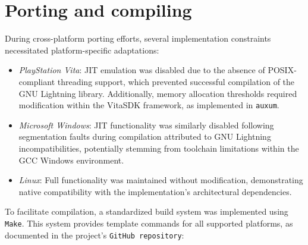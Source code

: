 \section{Porting and compiling}
\label{sec:ch4sec2}

\par During cross-platform porting efforts, several implementation constraints necessitated platform-specific adaptations:
\begin{itemize}
    \item \textit{PlayStation Vita}: JIT emulation was disabled due to the absence of POSIX-compliant threading support, which prevented successful compilation of the GNU Lightning library. Additionally, memory allocation thresholds required modification within the VitaSDK framework, as implemented in \texttt{auxum\cite{GithubAuxum}}.
    \item \textit{Microsoft Windows}: JIT functionality was similarly disabled following segmentation faults during compilation attributed to GNU Lightning incompatibilities, potentially stemming from toolchain limitations within the GCC Windows environment.
    \item \textit{Linux}: Full functionality was maintained without modification, demonstrating native compatibility with the implementation's architectural dependencies.
\end{itemize}

\par To facilitate compilation, a standardized build system was implemented using \texttt{Make}. This system provides template commands for all supported platforms, as documented in the project's \texttt{GitHub repository\cite{GithubEdra}}:

